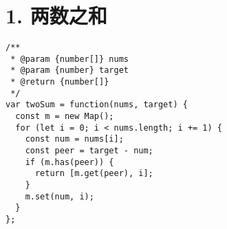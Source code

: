 \newpage
\section{1. 两数之和}
\label{leetcode:1}

\begin{verbatim}
/**
 * @param {number[]} nums
 * @param {number} target
 * @return {number[]}
 */
var twoSum = function(nums, target) {
  const m = new Map();
  for (let i = 0; i < nums.length; i += 1) {
    const num = nums[i];
    const peer = target - num;
    if (m.has(peer)) {
      return [m.get(peer), i];
    }
    m.set(num, i);
  }
};
\end{verbatim}
